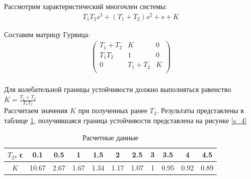 \documentclass[a4paper,12pt]{article}
\begin{document}
	\noindent Рассмотрим характеристический многочлен системы:\\
	\begin{gather}
	T_1T_2s^3+(T_1+T_2)s^2+s+K
	\end{gather}
	\par
	\noindent Составим матрицу Гурвица:\\
	\begin{gather}
	 \left( \begin{matrix} 
	T_1+T_2 & K & 0 \\ 
	T_1T_2 & 1 & 0 \\ 
	0 & T_1+T_2 & K \\ 
	\end{matrix} \right) 
	\end{gather}
	\\
	Для колебательной границы устойчивости должно выполняться равенство $K=\displaystyle\frac{T_1+T_2}{T_1T_2}$\\
	
	\noindent Рассчитаем значения $K$ при полученных ранее $T_2$. Результаты представлены в таблице \ref{t_2}, получившаяся граница устойчивости представлена на рисунке \ref{s_4}
	 \begin{table}[h]
	 	\caption{Расчетные данные}
	 	\renewcommand{\arraystretch}{2} 
	 	\renewcommand{\tabcolsep}{0.4cm}
	 	\begin{center}
	 		\begin{tabular}{|c|c|c|c|c|c|c|c|c|c|c|}
	 			\hline
	 			$T_2$, с & 0.1 & 0.5 & 1 & 1.5 & 2 & 2.5 & 3 & 3.5 & 4 & 4.5 \\ \hline
	 			$K$ & 10.67 & 2.67 & 1.67 & 1.34 & 1.17 & 1.07 & 1 & 0.95 & 0.92 & 0.89 \\ \hline
	 		\end{tabular}
	 	\end{center}
	 	\label{t_2}
	 \end{table}
	 
\end{document}
